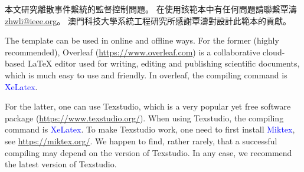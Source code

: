 本文研究離散事件繫統的監督控制問題。
在使用該範本中有任何問題請聯繫覃濤
\href{mailto:zhwli@ieee.org}{zhwli@ieee.org}。
澳門科技大學系統工程研究所感謝覃濤對設計此範本的貢獻。


\medskip\medskip

The template can be used in online and offline ways. For the former (highly recommended), 
Overleaf (\url{https://www.overleaf.com}) is a collaborative cloud-based LaTeX editor used for writing, editing and publishing scientific documents, which is much easy to use and friendly. In overleaf, the compiling command is \textcolor{blue}{XeLatex}.

For the latter, one can use Texstudio, which is a very popular yet free software package (\url{https://www.texstudio.org/}). When using Texstudio, the compiling command is \textcolor{blue}{XeLatex}. To make Texstudio work, one need to first install \textcolor{blue}{Miktex}, see \url{https://miktex.org/}. We happen to find, rather rarely, that a successful compiling may depend on the version of Texstudio. In any case, we recommend the latest version of Texstudio.




